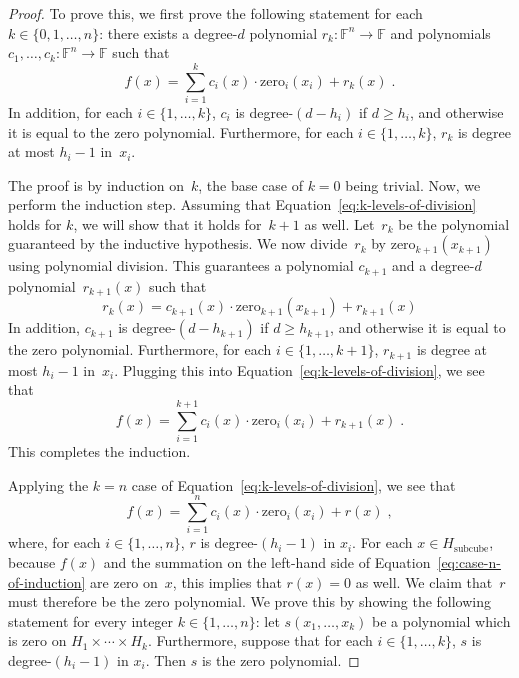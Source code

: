 \documentclass[11pt]{article}
\theoremstyle{definition}
\newcommand{\F}{\ensuremath{\mathbb{F}}}
\begin{document}
  \begin{proof}
    To prove this, we first prove the following statement for each $k \in \{0,
    1, \ldots, n\}$: there exists a degree-$d$ polynomial $r_k:\F^{n}
    \rightarrow \F$ and polynomials $c_1, \ldots, c_k:\F^n \rightarrow \F$ such
    that
  \begin{equation}\label{eq:k-levels-of-division}
  f(x) = \sum_{i=1}^k c_i(x) \cdot \mathrm{zero}_i(x_i) + r_k(x)\;.
  \end{equation}
  In addition, for each $i \in \{1, \ldots, k\}$, $c_i$ is degree-$(d-h_i)$ if
  $d \geq h_i$, and otherwise it is equal to the zero polynomial.
  Furthermore, for each $i \in \{1, \ldots, k\}$, $r_k$ is degree at most $h_i -
  1$ in~$x_i$.
  
  The proof is by induction on~$k$, the base case of $k = 0$ being trivial.
  Now, we perform the induction step.
  Assuming that Equation~\eqref{eq:k-levels-of-division} holds for $k$, we will
  show that it holds for~$k+1$ as well.
  Let~$r_k$ be the polynomial guaranteed by the inductive hypothesis.
  We now divide~$r_k$ by $\mathrm{zero}_{k+1}(x_{k+1})$ using polynomial
  division.
  This guarantees a polynomial $c_{k+1}$ and a degree-$d$
  polynomial~$r_{k+1}(x)$ such that
  \begin{equation*}
  r_k(x) = c_{k+1}(x) \cdot \mathrm{zero}_{k+1}(x_{k+1}) + r_{k+1}(x)
  \end{equation*}
  In addition, $c_{k+1}$ is degree-$(d-h_{k+1})$ if $d \geq h_{k+1}$, and
  otherwise it is equal to the zero polynomial.
  Furthermore, for each $i \in \{1, \ldots, k+1\}$, $r_{k+1}$ is degree at most
  $h_i - 1$ in~$x_i$.
  Plugging this into Equation~\eqref{eq:k-levels-of-division}, we see that
  \begin{equation}\label{eq:almost-there}
  f(x) = \sum_{i=1}^{k+1} c_i(x) \cdot \mathrm{zero}_i(x_i) + r_{k+1}(x)\;.  
  \end{equation}
  This completes the induction.
  
  Applying the $k = n$ case of Equation~\eqref{eq:k-levels-of-division}, we see
  that
  \begin{equation}\label{eq:case-n-of-induction}
  f(x) = \sum_{i=1}^n c_i(x) \cdot \mathrm{zero}_i(x_i) + r(x)\;,
  \end{equation}
  where, for each $i \in \{1, \ldots, n\}$, $r$ is degree-$(h_i-1)$ in $x_i$.
  For each $x \in H_{\mathrm{subcube}}$, because $f(x)$ and the summation on the
  left-hand side of Equation~\eqref{eq:case-n-of-induction} are zero on~$x$,
  this implies that $r(x) = 0$ as well.
  We claim that~$r$ must therefore be the zero polynomial.
  We prove this by showing the following statement for every integer $k \in \{1,
  \ldots, n\}$: let $s(x_1, \ldots, x_k)$ be a polynomial which is zero on $H_1
  \times \cdots \times H_k$.
  Furthermore, suppose that for each $i \in \{1, \ldots, k\}$, $s$ is
  degree-$(h_i-1)$ in $x_i$.
  Then $s$ is the zero polynomial.
  

\end{proof}
\end{document}
